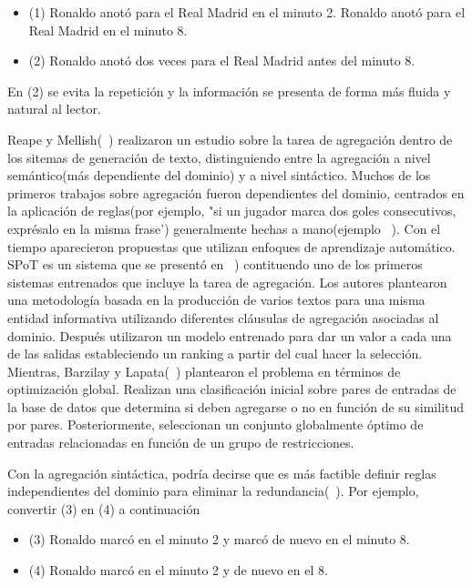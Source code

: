 \begin{itemize}
    \item (1) Ronaldo anot\'o para el Real Madrid en el minuto 2. Ronaldo anot\'o para el Real Madrid en el minuto 8.
    \item (2) Ronaldo anot\'o dos veces para el Real Madrid antes del minuto 8.
\end{itemize}

    En (2) se evita la repetici\'on y la información se presenta de forma m\'as fluida y natural al lector.
    
    Reape y Mellish(~\cite{reape1999just}) realizaron un estudio sobre la tarea de agregación dentro de los sitemas de generación 
de texto, distinguiendo entre la agregación a nivel semántico(más dependiente del dominio) y a nivel sintáctico. Muchos de los primeros 
trabajos sobre agregación fueron dependientes del dominio, centrados en la aplicación de reglas(por ejemplo, 
"si un jugador marca dos goles consecutivos, expr\'esalo en la misma frase') generalmente hechas a mano(ejemplo ~\cite{Shaw1998ClauseAU}). 
Con el tiempo aparecieron propuestas que utilizan enfoques de aprendizaje autom\'atico. SPoT es un sistema que se present\'o en ~\cite{walker2001spot}) 
contituendo uno de los primeros sistemas entrenados que incluye la tarea de agregación. Los autores plantearon una metodolog\'ia basada en la producci\'on 
de varios textos para una misma entidad informativa utilizando diferentes cl\'ausulas de agregación asociadas al dominio. Despu\'es utilizaron un modelo 
entrenado para dar un valor a cada una de las salidas estableciendo un ranking a partir del cual hacer la selección. Mientras, Barzilay y Lapata(~\cite{Barzilay2006AggregationVS})
plantearon el problema en términos de optimización global. Realizan una clasificación inicial sobre pares de entradas de la base de datos que determina 
si deben agregarse o no en función de su similitud por pares. Posteriormente, seleccionan un conjunto globalmente óptimo de entradas relacionadas en función
de un grupo de restricciones.

    Con la agregación sintáctica, podría decirse que es más factible definir reglas independientes del dominio para eliminar la 
redundancia(~\cite{Gatt2018SurveyOT}). Por ejemplo, convertir (3) en (4) a continuación

\begin{itemize}
    \item (3) Ronaldo marcó en el minuto 2 y marcó de nuevo en el minuto 8.
    \item (4) Ronaldo marcó en el minuto 2 y de nuevo en el 8.
\end{itemize}
    
